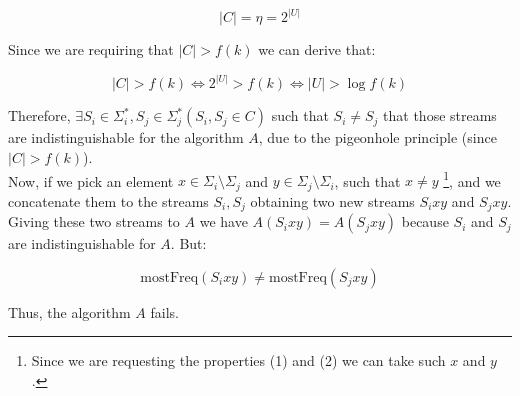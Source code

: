 \documentclass{article}
\begin{document}
\begin{equation*}
    |C| = \eta = 2^{|U|}
\end{equation*}

\noindent Since we are requiring that $|C| > f(k)$ we can derive that:

\begin{equation*}
    |C| > f(k) \iff 2^{|U|} > f(k) \iff |U| > \log{f(k)}
\end{equation*}

\noindent Therefore, $\exists S_i \in \Sigma_{i}^*, S_j \in \Sigma_{j}^{*} (S_i, S_j \in C)$ such that $S_i \ne S_j $ that those streams are indistinguishable for the algorithm $A$, due to the pigeonhole principle (since $|C| > f(k)$).\\

\noindent Now, if we pick an element $x \in \Sigma_i \setminus \Sigma_j$ and $y \in \Sigma_j \setminus \Sigma_i$, such that $x \ne y$ \footnote{Since we are requesting the properties (1) and (2) we can take such $x$ and $y$.}, and we concatenate them to 
the streams $S_i, S_j$ obtaining two new streams $S_ixy$ and $S_jxy$. Giving these two streams to $A$ we have $A(S_i xy) = A(S_j xy)$ because $S_i$ and $S_j$ are
indistinguishable for $A$. But:

\begin{equation*}
    \textrm{mostFreq}(S_i xy) \ne \textrm{mostFreq}(S_j xy)
\end{equation*}

\noindent Thus, the algorithm $A$ fails.
\end{document}
